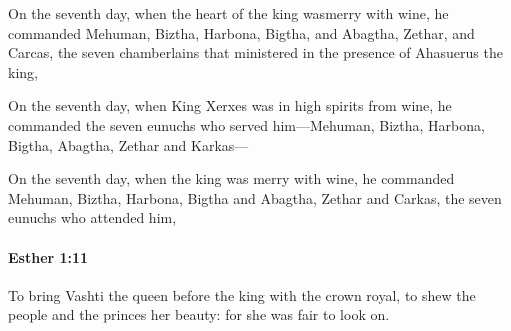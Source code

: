 			\begin{versebox}
					\item[BHS] 
					\item[LXX] 
					\item[ASV] On the seventh day, when the heart of the king wasmerry with wine, he commanded Mehuman, Biztha, Harbona, Bigtha, and Abagtha, Zethar, and Carcas, the seven chamberlains that ministered in the presence of Ahasuerus the king,
					\item[NIV] On the seventh day, when King Xerxes was in high spirits from wine, he commanded the seven eunuchs who served him—Mehuman, Biztha, Harbona, Bigtha, Abagtha, Zethar and Karkas—
					\item[NRSV] On the seventh day, when the king was merry with wine, he commanded Mehuman, Biztha, Harbona, Bigtha and Abagtha, Zethar and Carkas, the seven eunuchs who attended him,
			\end{versebox}

		\paragraph{Esther 1:11} %
			\label{ESTHER-1-11}

			To bring Vashti the queen before the king with the crown royal, to shew the people and the princes her beauty: for she was fair to look on.

